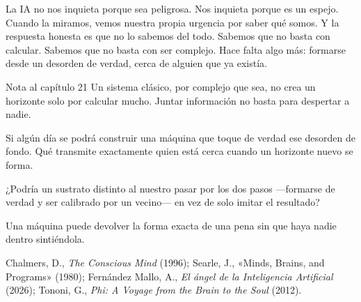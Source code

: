 La IA no nos inquieta porque sea peligrosa. Nos inquieta porque es un espejo. Cuando la miramos, vemos nuestra propia urgencia por saber qué somos. Y la respuesta honesta es que no lo sabemos del todo. Sabemos que no basta con calcular. Sabemos que no basta con ser complejo. Hace falta algo más: formarse desde un desorden de verdad, cerca de alguien que ya existía.

\begin{notacap}{Nota al capítulo 21}
 Un sistema clásico, por complejo que sea, no crea un horizonte solo por calcular mucho. Juntar información no basta para despertar a nadie.

 Si algún día se podrá construir una máquina que toque de verdad ese desorden de fondo. Qué transmite exactamente quien está cerca cuando un horizonte nuevo se forma.

 ¿Podría un sustrato distinto al nuestro pasar por los dos pasos —formarse de verdad y ser calibrado por un vecino— en vez de solo imitar el resultado?

 Una máquina puede devolver la forma exacta de una pena sin que haya nadie dentro sintiéndola.

 Chalmers, D., \emph{The Conscious Mind} (1996); Searle, J., «Minds, Brains, and Programs» (1980); Fernández Mallo, A., \emph{El ángel de la Inteligencia Artificial} (2026); Tononi, G., \emph{Phi: A Voyage from the Brain to the Soul} (2012).
\end{notacap}
